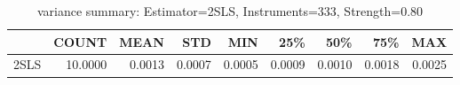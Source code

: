 \begin{table}[ht]
\centering
\caption{variance summary: Estimator=2SLS, Instruments=333, Strength=0.80}
\begin{tabular}{lrrrrrrrr}
\toprule
 & COUNT & MEAN & STD & MIN & 25\% & 50\% & 75\% & MAX \\
\midrule
2SLS & 10.0000 & 0.0013 & 0.0007 & 0.0005 & 0.0009 & 0.0010 & 0.0018 & 0.0025 \\
\bottomrule
\end{tabular}
\end{table}

